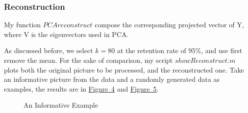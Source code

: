 \documentclass{article}
\begin{document}
\subsubsection{Reconstruction}
\label{sec-1.1.4}
My function $PCAreconstruct$ compose the corresponding projected vector of Y, where V is the eigenvectors used in PCA.

As discussed before, we select $k=80$ at the retention rate of $95\%$, and use first remove the mean. For the sake of comparison, my script $showReconstruct.m$ plots both the original picture to be processed, and the reconstructed one. Take an informative picture from the data and a randomly generated data as examples, the results are in \hyperref[fig-4]{Figure~4} and \hyperref[fig-5]{Figure~5}.

\begin{figure}
	\centering
	\quad
	\caption{An Informative Example}
	\label{fig-4}
\end{figure}
\end{document}
